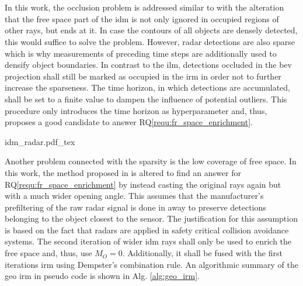\\\\
In this work, the occlusion problem is addressed similar to \cite{werber2015automotive} with the alteration that the free space part of the \gls{idm} is not only ignored in occupied regions of other rays, but ends at it. In case the contours of all objects are densely detected, this would suffice to solve the problem. However, radar detections are also sparse which is why measurements of preceding time steps are additionally used to densify object boundaries. In contrast to the \gls{ilm}, detections occluded in the \gls{bev} projection shall still be marked as occupied in the \gls{irm} in order not to further increase the sparseness. The time horizon, in which detections are accumulated, shall be set to a finite value to dampen the influence of potential outliers. This procedure only introduces the time horizon as hyperparameter and, thus, proposes a good candidate to answer RQ\ref{requ:fr_space_enrichment}.
\begin{center}
	{idm_radar.pdf_tex}
\end{center}
Another problem connected with the sparsity is the low coverage of free space. In this work, the method proposed in \cite{prophet2018adaptions} is altered to find an answer for RQ\ref{requ:fr_space_enrichment} by instead casting the original rays again but with a much wider opening angle. This assumes that the manufacturer's prefiltering of the raw radar signal is done in away to preserve detections belonging to the object closest to the sensor. The justification for this assumption is based on the fact that radars are applied in safety critical collision avoidance systems. The second iteration of wider \gls{idm} rays shall only be used to enrich the free space and, thus, use $M_O = 0$. Additionally, it shall be fused with the first iterations \gls{irm} using Dempster's combination rule. An algorithmic summary of the geo \gls{irm} in pseudo code is shown in Alg. \ref{alg:geo_irm}.
\\\\
